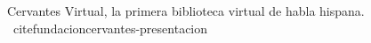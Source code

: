 Cervantes Virtual, la primera biblioteca virtual de habla hispana. \ cite{fundacioncervantes-presentacion}

  
  
  